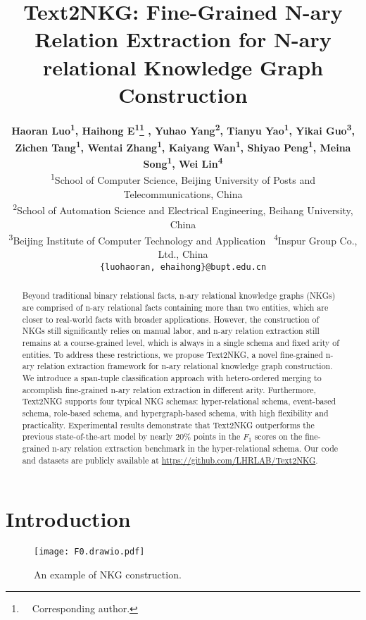 \documentclass{article} \usepackage{iclr2024_conference,times}
\title{Text2NKG: Fine-Grained N-ary Relation Extraction for N-ary relational Knowledge Graph Construction}
\author{{\bf Haoran Luo\textsuperscript{\rm 1}, Haihong E\textsuperscript{\rm 1}\thanks{\ \ Corresponding author.}  , Yuhao Yang\textsuperscript{\rm 2}, Tianyu Yao\textsuperscript{\rm 1}, Yikai Guo\textsuperscript{\rm 3},} \\{\bf Zichen Tang\textsuperscript{\rm 1}, Wentai Zhang\textsuperscript{\rm 1}, Kaiyang Wan\textsuperscript{\rm 1}, Shiyao Peng\textsuperscript{\rm 1}, Meina Song\textsuperscript{\rm 1}, Wei Lin\textsuperscript{\rm 4}} \\
         \textsuperscript{1}School of Computer Science, Beijing University of Posts and Telecommunications, China \\ 
         \textsuperscript{2}School of Automation Science and Electrical Engineering, Beihang University, China \\ 
         \textsuperscript{3}Beijing Institute of Computer Technology and Application 
         \ \textsuperscript{4}Inspur Group Co., Ltd., China \\ 
         \texttt{\{luohaoran, ehaihong\}@bupt.edu.cn}}
\begin{document}
\maketitle

\begin{abstract}
Beyond traditional binary relational facts, n-ary relational knowledge graphs (NKGs) are comprised of n-ary relational facts containing more than two entities, which are closer to real-world facts with broader applications. However, the construction of NKGs still significantly relies on manual labor, and n-ary relation extraction still remains at a course-grained level, which is always in a single schema and fixed arity of entities. To address these restrictions, we propose Text2NKG, a novel fine-grained n-ary relation extraction framework for n-ary relational knowledge graph construction. We introduce a span-tuple classification approach with hetero-ordered merging to accomplish fine-grained n-ary relation extraction in different arity. Furthermore, Text2NKG supports four typical NKG schemas: hyper-relational schema, event-based schema, role-based schema, and hypergraph-based schema, with high flexibility and practicality. Experimental results demonstrate that Text2NKG outperforms the previous state-of-the-art model by nearly 20\% points in the $F_1$ scores on the fine-grained n-ary relation extraction benchmark in the hyper-relational schema. Our code and datasets are publicly available at \url{https://github.com/LHRLAB/Text2NKG}.
\end{abstract}

\section{Introduction}
\label{introduction}


\begin{wrapfigure}{r}{0.5\textwidth}
\vspace{-5mm}
\centering
\texttt{[image: F0.drawio.pdf]}
\caption{An example of NKG construction.}
\label{f0}
\vspace{-2mm}
\end{wrapfigure}
\end{document}
